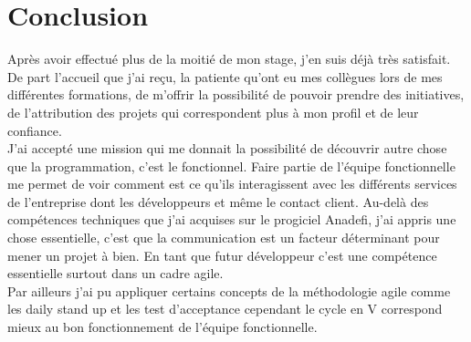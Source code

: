 \section{Conclusion}

Après avoir effectué plus de la moitié de mon stage, j'en suis déjà très satisfait. De part l'accueil que j'ai reçu, la patiente qu'ont eu mes collègues lors de mes différentes formations, de m'offrir la possibilité de pouvoir prendre des initiatives, de l'attribution des projets qui correspondent plus à mon profil et de leur confiance.\\

J'ai accepté une mission qui me donnait la possibilité de découvrir autre chose que la programmation, c'est le fonctionnel. Faire partie de l'équipe fonctionnelle me permet de voir comment est ce qu'ils interagissent avec les différents services de l'entreprise dont les développeurs et même le contact client. Au-delà des compétences techniques que j'ai acquises sur le progiciel Anadefi, j'ai appris une chose essentielle, c'est que la communication est un facteur déterminant pour mener un projet à bien. En tant que futur développeur c'est une compétence essentielle surtout dans un cadre agile.\\

Par ailleurs j'ai pu appliquer certains concepts de la méthodologie agile comme les daily stand up et les test d'acceptance cependant le cycle en V correspond mieux au bon fonctionnement de l'équipe fonctionnelle.

